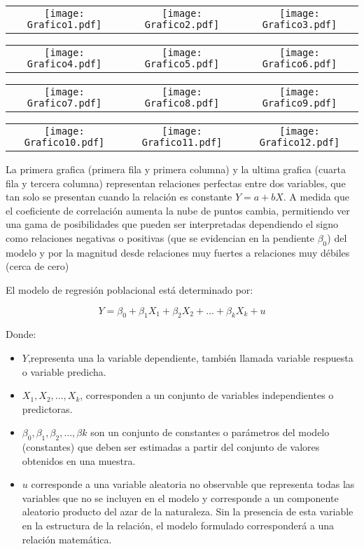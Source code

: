 \documentclass[base=hide,12pt]{elegantbook}
\begin{document}
	
	\begin{tabular}{ccc}
		\texttt{[image: Grafico1.pdf]}&
		\texttt{[image: Grafico2.pdf]}&
		\texttt{[image: Grafico3.pdf]} \\
	\end{tabular}
	\begin{tabular}{ccc}
		\texttt{[image: Grafico4.pdf]} &
		\texttt{[image: Grafico5.pdf]}&
		\texttt{[image: Grafico6.pdf]}\\
		\end{tabular}
\begin{tabular}{ccc}	
		\texttt{[image: Grafico7.pdf]}&
		\texttt{[image: Grafico8.pdf]}&
		\texttt{[image: Grafico9.pdf]}\\
	\end{tabular}
\begin{tabular}{ccc}		
		\texttt{[image: Grafico10.pdf]}&
		\texttt{[image: Grafico11.pdf]}&
		\texttt{[image: Grafico12.pdf]}\\
	\end{tabular}
	
	La primera grafica (primera fila y primera columna) y la ultima grafica (cuarta fila y tercera columna) representan relaciones perfectas entre dos variables, que tan solo se presentan cuando la relación es constante $Y = a + bX$.  A medida que el coeficiente de correlación aumenta la nube de puntos cambia, permitiendo ver una gama de posibilidades que pueden ser interpretadas dependiendo el signo como relaciones negativas o positivas (que se evidencian en la pendiente $\beta_{0}$) del modelo y por la magnitud desde relaciones muy fuertes a relaciones muy débiles (cerca de cero)
	
	
	El modelo de regresión poblacional está determinado por:
	
	\begin{Box2}{}
	\begin{equation*}
	Y=\beta_{0}+\beta_{1}X_{1}+\beta_{2}X_{2}+ \dots + \beta_{k}X_{k} +u
	\end{equation*}
	\end{Box2}
	
	
	Donde:
	\begin{itemize}
		\item $Y$,representa una la variable dependiente, también llamada variable respuesta o variable predicha.
		\item $X_{1},X_{2},\dots, X_{k}$, corresponden a un conjunto de variables independientes o predictoras.
		\item $\beta_{0},\beta_{1},\beta_{2},\dots, \beta{k}$ son un conjunto de constantes o parámetros del modelo (constantes) que deben ser estimadas a partir del conjunto de valores obtenidos en una muestra.
		\item $u$ corresponde a una variable aleatoria no observable que representa todas las variables que no se incluyen en el modelo y corresponde a un componente aleatorio producto del azar de la naturaleza. Sin la presencia de esta variable en la estructura de la relación, el modelo formulado corresponderá a una relación matemática.
	\end{itemize}
\end{document}
